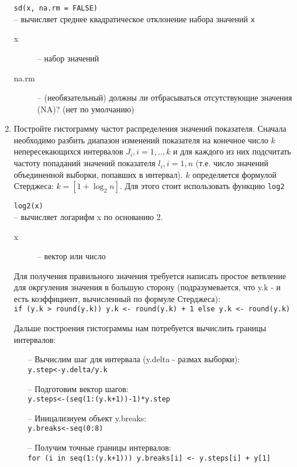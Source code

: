 \begin{enumerate}
\begin{mdframed}[style=BadassFrame]
              \texttt{sd(x, na.rm = FALSE)} \\
              	-- вычисляет среднее квадратическое отклонение набора значений \texttt{x}
              \begin{description}

                \item[x] -- набор значений
                \item[na.rm] -- (необязательный) должны ли отбрасываться отсутствующие значения (NA)? (нет по умолчанию)
              \end{description}
        \end{mdframed}

	\item Постройте гистограмму частот распределения значений показателя.
		Сначала необходимо разбить диапазон изменений показателя на конечное число $k$
		непересекающихся интервалов $J_{i}, i=1,..,k$  и для каждого из них 
		подсчитать частоту попаданий значений показателя $l_{i}, i=\overline{1,n}$
		(т.е. число значений объединенной выборки, попавших в интервал).
		$k$ определяется формулой Стерджеса: $k=[1+\log_2 n]$.
		Для этого стоит использовать функцию \texttt{log2}

		\begin{mdframed}[style=BadassFrame]
			\texttt{log2(x)} \\
				-- вычисляет логарифм x по основанию 2.
			\begin{description}

				\item[x] -- вектор или число
			\end{description}
		\end{mdframed}

		Для получения правильного значения требуется написать простое ветвление для окргуления значения в большую сторону
		(подразумевается, что y.k - и есть коэффициент, вычисленный по формуле Стерджеса):\\
		\texttt{if (y.k > round(y.k)) y.k <- round(y.k) + 1 else y.k <- round(y.k)}
		
		Дальше построения гистограммы нам потребуется вычислить границы интервалов:
		\begin{itemize}
			\item[--] Вычислим шаг для интервала (y.delta - размах выборки):\\
				\texttt{y.step<-y.delta/y.k}
			\item[--] Подготовим вектор шагов:\\
				\texttt{y.steps<-(seq(1:(y.k+1))-1)*y.step}
			\item[--] Иницализиуем объект y.breaks:\\
				\texttt{y.breaks<-seq(0:8)}
			\item[--] Получим точные границы интервалов:\\
				\texttt{for (i in seq(1:(y.k+1))) y.breaks[i] <- y.steps[i] + y[1]}
		\end{itemize}


\end{enumerate}
